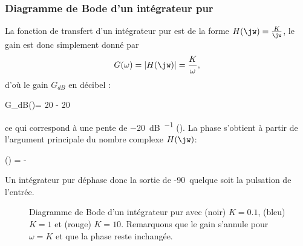 \subsubsection{Diagramme de Bode d'un intégrateur pur}
La fonction de transfert d'un intégrateur pur est de la forme 
$H(\jw)=\frac{K}{\jw}$, le gain est donc simplement donné par 
\[
G(\omega)=|H(\jw)|=\frac{K}{\omega},
\] 
d'où le gain $G_{dB}$ en décibel :
\begin{bequation}
G_{dB}(\omega)= 20 - 20\log{\omega}
\end{bequation} 
ce qui correspond à une pente de \SI{-20}{\dB\per\dec} ().
La phase s'obtient à partir de l'argument principale 
du nombre complexe $H(\jw)$:
\begin{bequation}
\phi(\omega) = -
\end{bequation}
Un intégrateur pur déphase donc la sortie de -90\degreeSI~quelque soit la 
pulsation de l'entrée.
\begin{figure}[!htb]
    \centering
    

    
    \caption{Diagramme de Bode d'un intégrateur pur avec (noir) 
             $K=0.1$, (bleu) $K=1$ et (rouge) $K=10$. Remarquons 
             que le gain s'annule pour $\omega=K$ et que la phase reste 
             inchangée.\label{fig-bode_int}}
\end{figure}
\newpage
